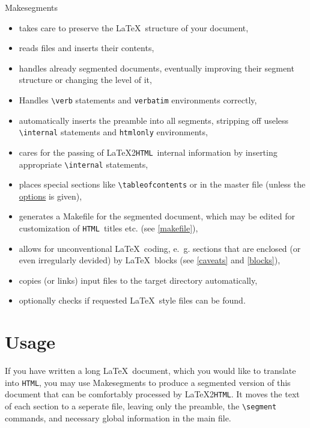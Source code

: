 \documentclass[a4paper,12pt]{article}
\newcommand{\htm}{{\tt HTML}}
\newcommand{\lhh}{{\rm \LaTeX2}\htm}
\begin{document}
Makesegments
\begin{itemize}
\item takes care to preserve the \LaTeX\ structure of your document,
\item reads \verb:: files and inserts their
  contents,
\item handles already segmented documents, eventually improving their
  segment structure or changing the level of it,
\item Handles \verb:\verb: statements and \verb+verbatim+ environments
  correctly,
\item automatically inserts the preamble into all segments, stripping
  off useless \verb+\internal+ statements and \verb+htmlonly+ environments,
\item cares for the passing of \lhh\ internal information by inserting
  appropriate \verb:\internal: statements,
\item places special sections like \verb:\tableofcontents: or
  \verb:: in the master file (unless the
  \hyperref{\texttt{ -e} option}{\texttt{-e} option, see }{}{options}
  is given),
\item generates a Makefile for the segmented document, which may be
  edited for customization of \htm\ titles etc. (see \ref{makefile}),
\item allows for unconventional \LaTeX\ coding, e.~g. sections that
  are enclosed (or even irregularly devided) by \LaTeX\ blocks (see
  \ref{caveats} and \ref{blocks}), 
\item copies (or links) input files to the target directory
  automatically, 
\item optionally checks if requested \LaTeX\ style files can be found.
\end{itemize}

\section{Usage}
\label{usage}

If you have written a long \LaTeX\ document, which you would like to
translate into \htm, you may use Makesegments to produce a segmented
version of this document that can be comfortably processed by \lhh.
It moves the text of each section to a seperate file, leaving only
the preamble, the \verb:\segment:
commands, and necessary global
information in the main file.
\end{document}
